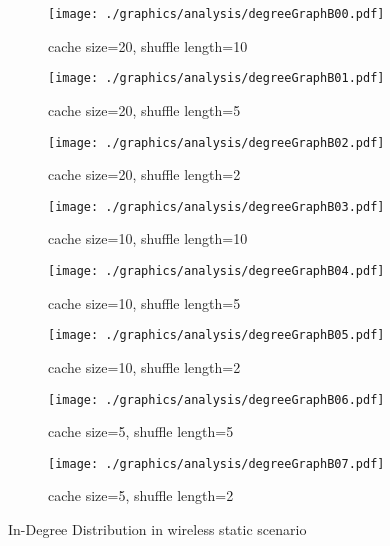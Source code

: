 \begin{figure}
\begin{subfigure}{.5\textwidth}
	\texttt{[image: ./graphics/analysis/degreeGraphB00.pdf]}
	\caption{cache size=20, shuffle
	length=10}
	\label{fig:inDegreeDistB00small}
\end{subfigure}%
\begin{subfigure}{.5\textwidth}
	\texttt{[image: ./graphics/analysis/degreeGraphB01.pdf]}
	\caption{cache size=20, shuffle
	length=5}
	\label{fig:inDegreeDistB01small}
\end{subfigure}
\begin{subfigure}{.5\textwidth}
	\texttt{[image: ./graphics/analysis/degreeGraphB02.pdf]}
	\caption{cache size=20, shuffle
	length=2}
	\label{fig:inDegreeDistB02small}
\end{subfigure}%
\begin{subfigure}{.5\textwidth}
	\texttt{[image: ./graphics/analysis/degreeGraphB03.pdf]}
	\caption{cache size=10, shuffle
	length=10}
	\label{fig:inDegreeDistB03small}
\end{subfigure}
\begin{subfigure}{.5\textwidth}
	\texttt{[image: ./graphics/analysis/degreeGraphB04.pdf]}
	\caption{cache size=10, shuffle
	length=5}
	\label{fig:inDegreeDistB04small}
\end{subfigure}%
\begin{subfigure}{.5\textwidth}
	\texttt{[image: ./graphics/analysis/degreeGraphB05.pdf]}
	\caption{cache size=10, shuffle
	length=2}
	\label{fig:inDegreeDistB05small}
\end{subfigure}
\begin{subfigure}{.5\textwidth}
	\texttt{[image: ./graphics/analysis/degreeGraphB06.pdf]}
	\caption{cache size=5, shuffle
	length=5}
	\label{fig:inDegreeDistB06small}
\end{subfigure}%
\begin{subfigure}{.5\textwidth}
	\texttt{[image: ./graphics/analysis/degreeGraphB07.pdf]}
	\caption{cache size=5, shuffle
	length=2}
	\label{fig:inDegreeDistB07small}
\end{subfigure}
\caption{In-Degree Distribution in wireless static scenario}
\end{figure}

